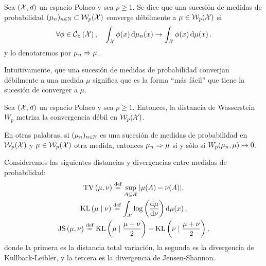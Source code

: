 {{	  \begin{definition}
		  Sea $(\cX, d)$ un espacio Polaco y sea $p \geq 1$. Se dice que una sucesión de medidas de probabilidad $(\mu_n)_{n \in \N} \subset \WassersteinSpace[p]{\cX} $ converge débilmente a $\mu \in \WassersteinSpace[p]{\cX}$ si
		  \begin{equation}
			  \forall \phi \in \ContBoundedSpace[\cX], \quad \int_{\cX} \phi(x) \dd{\mu_n(x)} \to \int_{\cX} \phi(x) \dmu[x].
		  \end{equation}
		  y lo denotaremos por $\mu_n \wto \mu$.
	  \end{definition}

	  \begin{note}
		  Intuitivamente, que una sucesión de medidas de probabilidad converjan débilmente a una medida $\mu$ significa que es la forma ``más fácil'' que tiene la sucesión de converger a $\mu$.
	  \end{note}

	  \begin{theorem}
		  Sea $(\cX, d)$ un espacio Polaco y sea $p \geq 1$. Entonces, la distancia de Wasserstein $W_p$  metriza la convergencia débil en $\WassersteinSpace[p]{\cX}$.
	  \end{theorem}

	  \begin{remark}
		  En otras palabras, si $(\mu_n)_{n\in\N}$ es una sucesión de medidas de probabilidad en $\WassersteinSpace[p]{\cX}$ y $\mu\in \WassersteinSpace[p]{\cX} $ otra medida, entonces $\mu_n \wto \mu$ si y sólo si $\Wasserstein[p]{\mu_n}{\mu} \to 0$.
	  \end{remark}

	  \begin{example}
		  Consideremos las siguientes distancias y divergencias entre medidas de probabilidad:
		  \begin{gather*}
			  \TV{\mu}{\nu} \eqdef \sup_{A \subseteq \cX} \abs{\mu(A) - \nu(A)}, \\
			  \KL{\mu}{\nu} \eqdef \int_{\cX} \log\left(\dv{\mu}{\nu}(x)\right) \dmu[x], \\
			  \JS{\mu}{\nu} \eqdef \KL{\mu}{\frac{\mu + \nu}{2}} + \KL{\nu}{\frac{\mu + \nu}{2}},
		  \end{gather*}
		  donde la primera es la distancia total variación, la segunda es la divergencia de Kullback-Leibler, y la tercera es la divergencia de Jensen-Shannon.


\end{example}}}
